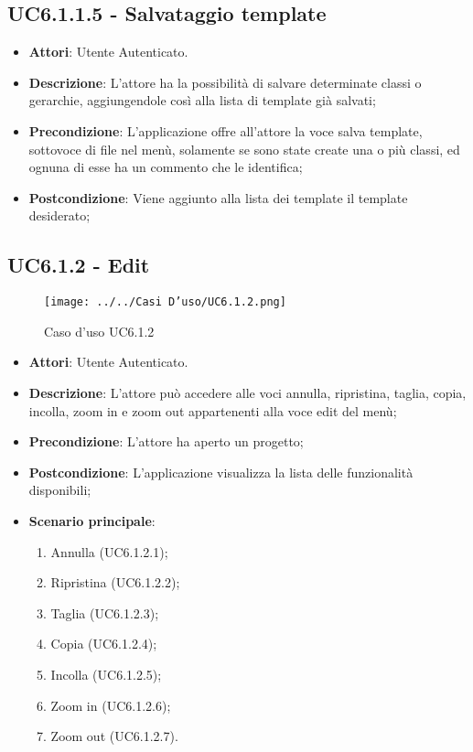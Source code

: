 \subsection{UC6.1.1.5 - Salvataggio template} 
\label{ssec:UC6.1.1.5} 
\begin{itemize} 
\item \textbf{Attori}: Utente Autenticato.
\item \textbf{Descrizione}: L’attore ha la possibilità di salvare determinate classi o gerarchie, aggiungendole così alla lista di template già salvati;
\item \textbf{Precondizione}: L’applicazione offre all’attore la voce salva template, sottovoce di file nel menù, solamente se sono state create una o più classi, ed ognuna di esse ha un commento che le identifica;
\item \textbf{Postcondizione}: Viene aggiunto alla lista dei template il template desiderato;
\end{itemize} 
\subsection{UC6.1.2 - Edit} 
\label{ssec:UC6.1.2} 
\begin{figure}[h!] 
\centering 
\texttt{[image: ../../Casi D'uso/UC6.1.2.png]} 
\caption{Caso d'uso UC6.1.2} 
 \end{figure} 
\begin{itemize} 
\item \textbf{Attori}: Utente Autenticato.
\item \textbf{Descrizione}: L’attore può accedere alle voci annulla, ripristina, taglia, copia, incolla, zoom in e zoom out appartenenti alla voce edit del menù;
\item \textbf{Precondizione}: L'attore ha aperto un progetto;
\item \textbf{Postcondizione}: L’applicazione visualizza la lista delle funzionalità disponibili;
\item \textbf{Scenario principale}: \begin{enumerate}\item Annulla (UC6.1.2.1);\item Ripristina (UC6.1.2.2);\item Taglia (UC6.1.2.3);\item Copia (UC6.1.2.4);\item Incolla (UC6.1.2.5);\item Zoom in (UC6.1.2.6);\item Zoom out (UC6.1.2.7). 
 \end{enumerate}
\end{itemize} 
